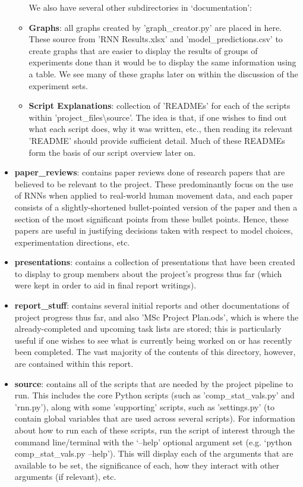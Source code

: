 \documentclass[12pt,twoside]{report}
\begin{document}
\begin{itemize}
\begin{itemize}
	We also have several other subdirectories in ‘documentation’:
		\item \textbf{Graphs}: all graphs created by 'graph\_creator.py' are placed in here. These source from 'RNN Results.xlsx' and 'model\_predictions.csv' to create graphs that are easier to display the results of groups of experiments done than it would be to display the same information using a table. We see many of these graphs later on within the discussion of the experiment sets.
		\item \textbf{Script Explanations}: collection of 'READMEs' for each of the scripts within 'project\_files\textbackslash source'. The idea is that, if one wishes to find out what each script does, why it was written, etc., then reading its relevant 'README' should provide sufficient detail. Much of these READMEs form the basis of our script overview later on.
	\end{itemize}
	\item \textbf{paper\_reviews}: contains paper reviews done of research papers that are believed to be relevant to the project. These predominantly focus on the use of RNNs when applied to real-world human movement data, and each paper consists of a slightly-shortened bullet-pointed version of the paper and then a section of the most significant points from these bullet points. Hence, these papers are useful in justifying decisions taken with respect to model choices, experimentation directions, etc.
	\item \textbf{presentations}: contains a collection of presentations that have been created to display to group members about the project's progress thus far (which were kept in order to aid in final report writings).
	\item \textbf{report\_stuff}: contains several initial reports and other documentations of project progress thus far, and also 'MSc Project Plan.ods', which is where the already-completed and upcoming task lists are stored; this is particularly useful if one wishes to see what is currently being worked on or has recently been completed. The vast majority of the contents of this directory, however, are contained within this report.
	\item \textbf{source}: contains all of the scripts that are needed by the project pipeline to run. This includes the core Python scripts (such as 'comp\_stat\_vals.py' and 'rnn.py'), along with some 'supporting' scripts, such as 'settings.py' (to contain global variables that are used across several scripts). For information about how to run each of these scripts, run the script of interest through the command line/terminal with the ‘--help' optional argument set (e.g. ‘python comp\_stat\_vals.py --help'). This will display each of the arguments that are available to be set, the significance of each, how they interact with other arguments (if relevant), etc.

\end{itemize}
\end{document}
